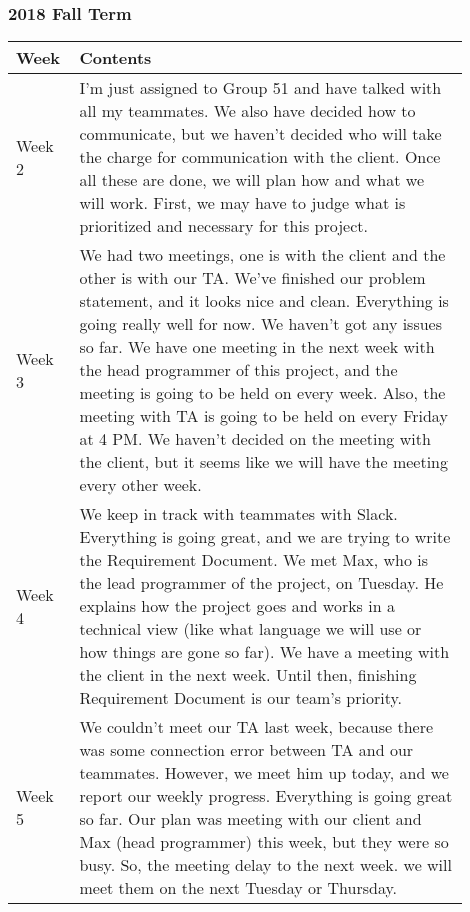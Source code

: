 \documentclass[10pt]{article}
\begin{document}
        \subsubsection{2018 Fall Term}
            \begin{center}
            \begin{tabular}{ | p{0.1\linewidth} | p{0.8\linewidth} | } \hline
                Week & Contents  \\ \hline
                Week 2 &  I'm just assigned to Group 51 and have talked with all my teammates.
                We also have decided how to communicate, but we haven't decided who will take the charge for communication with the client.
                Once all these are done, we will plan how and what we will work.
                First, we may have to judge what is prioritized and necessary for this project. \\ \hline
                Week 3 &  We had two meetings, one is with the client and the other is with our TA.
                We've finished our problem statement, and it looks nice and clean.
                Everything is going really well for now.
                We haven't got any issues so far.
                We have one meeting in the next week with the head programmer of this project, and the meeting is going to be held on every week.
                Also, the meeting with TA is going to be held on every Friday at 4 PM.
                We haven't decided on the meeting with the client, but it seems like we will have the meeting every other week.  \\ \hline
                Week 4 &  We keep in track with teammates with Slack.
                Everything is going great, and we are trying to write the Requirement Document.
                We met Max, who is the lead programmer of the project, on Tuesday.
                He explains how the project goes and works in a technical view (like what language we will use or how things are gone so far).
                We have a meeting with the client in the next week. Until then, finishing Requirement Document is our team's priority.\\ \hline
                Week 5 & We couldn't meet our TA last week, because there was some connection error between TA and our teammates.
                However, we meet him up today, and we report our weekly progress.
                Everything is going great so far.
                Our plan was meeting with our client and Max (head programmer) this week, but they were so busy.
                So, the meeting delay to the next week. we will meet them on the next Tuesday or Thursday.

\end{tabular}
\end{center}
\end{document}
